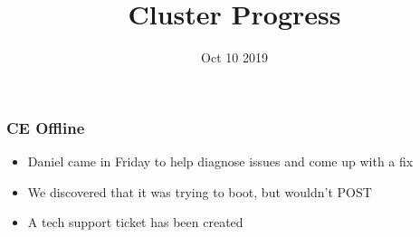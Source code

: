 \documentclass{beamer}
\title{Cluster Progress}
\date{Oct 10 2019}
\begin{document}

\begin{frame}
  \maketitle
\end{frame}


\begin{frame}
  \frametitle{CE Offline}

  \begin{itemize}
  \item Daniel came in Friday to help diagnose issues and come up with a fix
  \item We discovered that it was trying to boot, but wouldn't POST
  \item A tech support ticket has been created
  \end{itemize}
\end{frame}

\end{document}
